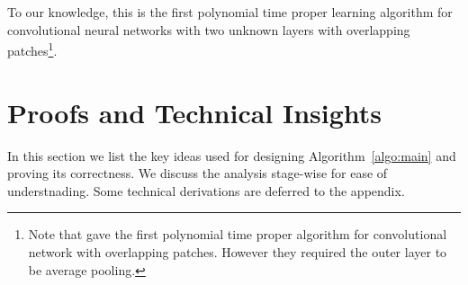 \documentclass[11pt]{article}
\begin{document}
To our knowledge, this is the first polynomial time proper learning algorithm for convolutional neural networks with two unknown layers with overlapping patches\footnote{Note that \citet{goel2018learning} gave the first polynomial time proper algorithm for convolutional network with overlapping patches. 
However they required the outer layer to be average pooling.}.


\section{Proofs and Technical Insights}
\label{sec:analysis}
In this section we list the key ideas used for designing Algorithm~\ref{algo:main} and proving its correctness. We discuss the analysis stage-wise for ease of understnading. 
Some technical derivations are deferred to the appendix.
\end{document}
